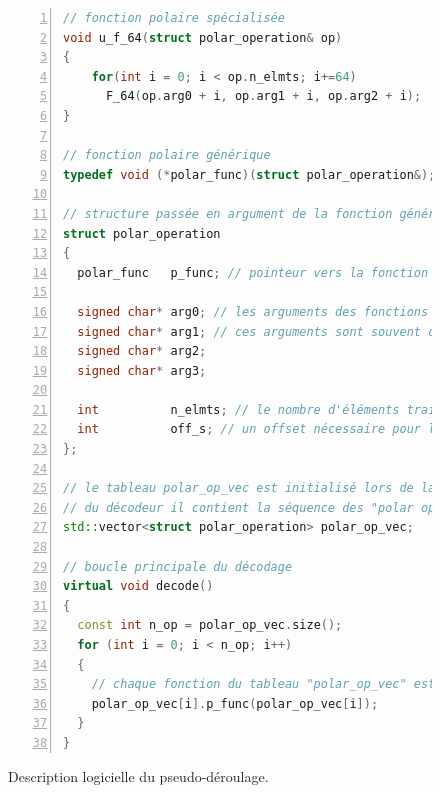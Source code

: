 \begin{figure}[htp]
\begin{lstlisting}[language=C++, numbers=left, numbersep=0.3em, tabsize=2, basicstyle=\footnotesize\ttfamily]
// fonction polaire spécialisée
void u_f_64(struct polar_operation& op)
{
    for(int i = 0; i < op.n_elmts; i+=64)
      F_64(op.arg0 + i, op.arg1 + i, op.arg2 + i);
}

// fonction polaire générique
typedef void (*polar_func)(struct polar_operation&);

// structure passée en argument de la fonction générique
struct polar_operation
{
  polar_func   p_func; // pointeur vers la fonction polaire spécialisée 

  signed char* arg0; // les arguments des fonctions polaires spécialisées
  signed char* arg1; // ces arguments sont souvent des adresses
  signed char* arg2;
  signed char* arg3;

  int          n_elmts; // le nombre d'éléments traités en parallèle
  int          off_s; // un offset nécessaire pour l'accès aux PSs
};

// le tableau polar_op_vec est initialisé lors de la construction
// du décodeur il contient la séquence des "polar operation"
std::vector<struct polar_operation> polar_op_vec;

// boucle principale du décodage
virtual void decode()
{
  const int n_op = polar_op_vec.size();
  for (int i = 0; i < n_op; i++)
  {
    // chaque fonction du tableau "polar_op_vec" est appelée
    polar_op_vec[i].p_func(polar_op_vec[i]); 
  }
}
\end{lstlisting}
\caption{Description logicielle du pseudo-déroulage.}
\label{fig:tensilica_code}
\end{figure}








